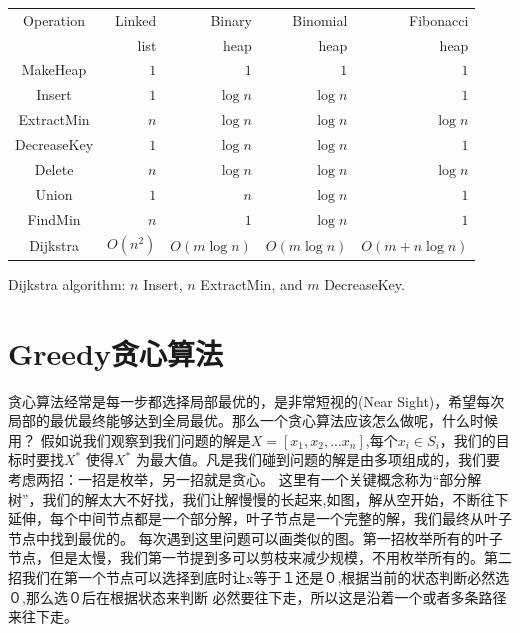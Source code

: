   \begin{table}
  \begin{tabular}{crrrr}
  \hline  \hline
  Operation & Linked  & Binary  & Binomial  & Fibonacci  \\
            &  list &  heap &  heap & heap \\
  \hline
  {\sc MakeHeap} & $ 1 $ &  $1$  & $ 1 $ & $1$  \\ 
  {\sc Insert} & $ 1 $ &  $\log n$  & $ \log n $ & $1$  \\ 
   {\sc ExtractMin} & $ n $ &  $\log n$  & $ \log n  $ & $ \log n $  \\ 
  {\sc DecreaseKey} & $ 1 $ &  $\log n$  & $ \log n $ & $1$  \\ 
  {\sc Delete} & $ n $ &  $\log n$  & $ \log n $ & $\log n$  \\ 
  {\sc Union} & $ 1 $ &  $ n $  & $ \log n $ & $1$  \\ 
   {\sc FindMin} & $ n $ &  $1$  & $ \log n $ & $1$  \\ 
  \hline 
  {\sc Dijkstra} & $ O(n^2) $ &  $ O(m \log n) $  & $ O( m \log n ) $ & $ O( m + n \log n) $  \\ 
  \hline \hline 
  \end{tabular} 
  \end{table}
{\sc Dijkstra} algorithm: $n$ {\sc Insert}, $n$ {\sc ExtractMin}, and $m$ {\sc DecreaseKey}. 

\section{Greedy贪心算法}
贪心算法经常是每一步都选择局部最优的，是非常短视的(Near Sight)，希望每次局部的最优最终能够达到全局最优。那么一个贪心算法应该怎么做呢，什么时候用？
假如说我们观察到我们问题的解是$X=[x_1,x_2,...x_n]$,每个$x_i \in S_i$，我们的目标时要找$X^*$ 使得$X^*$ 为最大值。凡是我们碰到问题的解是由多项组成的，我们要考虑两招：一招是枚举，另一招就是贪心。
这里有一个关键概念称为“部分解树”，我们的解太大不好找，我们让解慢慢的长起来,如图，解从空开始，不断往下延伸，每个中间节点都是一个部分解，叶子节点是一个完整的解，我们最终从叶子节点中找到最优的。
每次遇到这里问题可以画类似的图。第一招枚举所有的叶子节点，但是太慢，我们第一节提到多可以剪枝来减少规模，不用枚举所有的。第二招我们在第一个节点可以选择到底时让x等于１还是０,根据当前的状态判断必然选０,那么选０后在根据状态来判断
必然要往下走，所以这是沿着一个或者多条路径来往下走。

